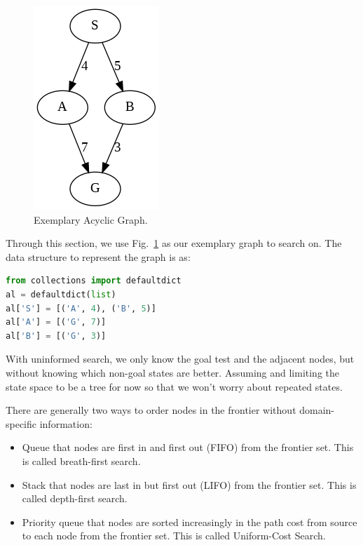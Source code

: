 \documentclass[main.tex]{subfiles}
\begin{document}
\begin{figure}[!ht]
    \centering
    \includegraphics[width=0.3\columnwidth]{fig/ucs.png}
        \caption{Exemplary Acyclic Graph. }
    \label{fig:ucs}
\end{figure}
Through this section, we use Fig.~\ref{fig:ucs} as our exemplary graph to search on. The data structure to represent the graph is as:
\begin{lstlisting}[language=Python]
from collections import defaultdict
al = defaultdict(list)
al['S'] = [('A', 4), ('B', 5)]
al['A'] = [('G', 7)]
al['B'] = [('G', 3)]
\end{lstlisting}

With uninformed search, we only know the goal test and the adjacent nodes, but without knowing which non-goal states are better. Assuming and limiting the state space to be a tree for now so that we won't worry about repeated states. 

There are generally two ways to order nodes in the frontier without domain-specific information:
\begin{itemize}
    \item Queue that nodes are first in and first out (FIFO) from the frontier set. This is called breath-first search.
    \item Stack that nodes are last in but first out (LIFO) from the frontier set. This is called depth-first search. 
    \item Priority queue that nodes are sorted increasingly in the path cost from source to each node from the frontier set. This is called Uniform-Cost Search.
\end{itemize}
\end{document}
